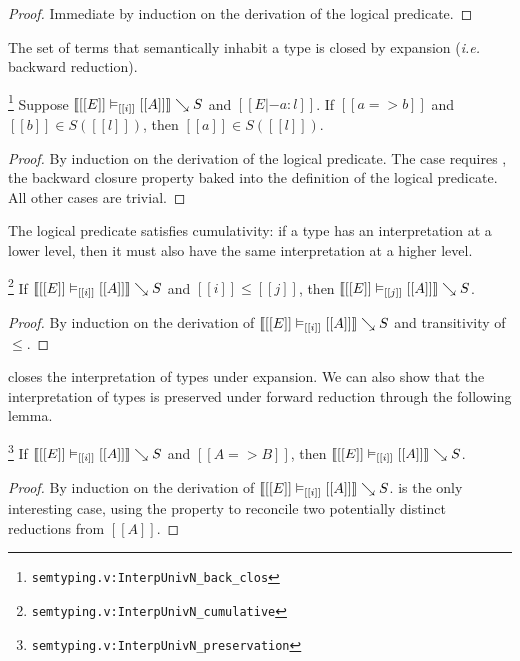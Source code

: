 \documentclass[acmsmall, screen=true, nonacm=true,
  review=\ifpublic false\else true\fi,
  anonymous=\ifanonymous true\else false\fi
]{acmart}
\makeatletter
\DeclarePairedDelimiter{\bracks}{\llbracket}{\rrbracket}
\newcommand{\ie}{\textit{i.e.}\@\xspace}
\newcommand{\suppl}[3]{{\scriptsize\texttt{#2:#3}}}
\newcommand{\interp}[4]{\bracks{#1 \vDash_{#2} #3} \searrow #4}
\newcommand{\member}[3]{#1 \in #3(#2)}
\newlength{\punctwidth}
\newcommand{\stack}[1]{%
  \settowidth{\punctwidth}{#1}%
  \hspace*{-\the\punctwidth}%
}
\makeatother
\begin{document}
\begin{proof}
  Immediate by induction on the derivation of the logical
  predicate.
\end{proof}

The set of terms that semantically inhabit a type is closed by
expansion (\ie backward reduction).

\begin{lemma}
  \stack{.~}\footnote{\suppl{theories}{semtyping.v}{InterpUnivN\_back\_clos}}
  \label{lem:backclos}
  Suppose $\interp{[[E]]}{[[i]]}{[[A]]}{S}$ and $[[E |- a : l]]$.
  If $[[a => b]]$ and $\member{[[b]]}{[[l]]}{S}$,
  then $\member{[[a]]}{[[l]]}{S}$.
\end{lemma}

\begin{proof}
  By induction on the derivation of the logical predicate. The
   case requires , the backward
  closure property baked into the definition of the logical
  predicate. All other cases are trivial.
\end{proof}

The logical predicate satisfies cumulativity: if a type has an
interpretation at a lower level, then it must also have the same
interpretation at a higher level.

\begin{lemma}[Cumulativity]
  \stack{.~}\footnote{\suppl{theories}{semtyping.v}{InterpUnivN\_cumulative}}
  \label{lem:cumulativity}
  If $\interp{[[E]]}{[[i]]}{[[A]]}{S}$ and $[[i]] \leq [[j]]$, then
  $\interp{[[E]]}{[[j]]}{[[A]]}{S}$.
\end{lemma}

\begin{proof}
  By induction on the derivation of $\interp{[[E]]}{[[i]]}{[[A]]}{S}$
  and transitivity of $\leq$.
\end{proof}

 closes the interpretation of types under
expansion. We can also show that the interpretation of types is
preserved under forward reduction through the following lemma.

\begin{lemma}
  \stack{.~}\footnote{\suppl{theories}{semtyping.v}{InterpUnivN\_preservation}}
\label{lem:lrpreservation}
  If $\interp{[[E]]}{[[i]]}{[[A]]}{S}$ and $[[A => B]]$, then
  $\interp{[[E]]}{[[i]]}{[[A]]}{S}$.
\end{lemma}

\begin{proof}
  By induction on the derivation of
  $\interp{[[E]]}{[[i]]}{[[A]]}{S}$.
   is the only interesting case,
  using the  property
  to reconcile two potentially distinct reductions
  from $[[A]]$.
\end{proof}
\end{document}
